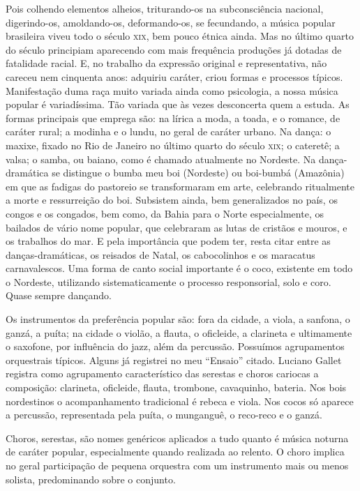 Pois colhendo elementos alheios, triturando-os na subconsciência
nacional, digerindo-os, amoldando-os, deformando-os, se fecundando, a
música popular brasileira viveu todo o século \textsc{xix}, bem pouco étnica
ainda. Mas no último quarto do século principiam aparecendo com mais
frequência produções já dotadas de fatalidade racial. E, no trabalho da
expressão original e representativa, não careceu nem cinquenta anos:
adquiriu caráter, criou formas e processos típicos. Manifestação duma
raça muito variada ainda como psicologia, a nossa música popular é
variadíssima. Tão variada que às vezes desconcerta quem a estuda. As
formas principais que emprega são: na lírica a moda, a toada, e o
romance, de caráter rural; a modinha e o lundu, no geral de caráter
urbano. Na dança: o maxixe, fixado no Rio de Janeiro no último quarto do
século \textsc{xix}; o cateretê; a valsa; o samba, ou baiano, como é chamado
atualmente no Nordeste. Na dança-dramática se distingue o bumba meu boi
(Nordeste) ou boi-bumbá (Amazônia) em que as fadigas do pastoreio se
transformaram em arte, celebrando ritualmente a morte e ressurreição do
boi. Subsistem ainda, bem generalizados no país, os congos e os
congados, bem como, da Bahia para o Norte especialmente, os bailados de
vário nome popular, que celebraram as lutas de cristãos e mouros, e os
trabalhos do mar. E pela importância que podem ter, resta citar entre as
danças-dramáticas, os reisados de Natal, os cabocolinhos e os maracatus
carnavalescos. Uma forma de canto social importante é o coco, existente
em todo o Nordeste, utilizando sistematicamente o processo responsorial,
solo e coro. Quase sempre dançando.

Os instrumentos da preferência popular são: fora da cidade, a viola, a
sanfona, o ganzá, a puíta; na cidade o violão, a flauta, o oficleide, a
clarineta e ultimamente o saxofone, por influência do jazz, além da
percussão. Possuímos agrupamentos orquestrais típicos. Alguns já
registrei no meu ``Ensaio'' citado. Luciano Gallet registra como
agrupamento característico das serestas e choros cariocas a composição:
clarineta, oficleide, flauta, trombone, cavaquinho, bateria. Nos bois
nordestinos o acompanhamento tradicional é rebeca e viola. Nos cocos só
aparece a percussão, representada pela puíta, o munganguê, o reco-reco e
o ganzá.

Choros, serestas, são nomes genéricos aplicados a tudo quanto é
música noturna de caráter popular, especialmente quando realizada ao
relento. O choro implica no geral participação de pequena orquestra com
um instrumento mais ou menos solista, predominando sobre o conjunto.


